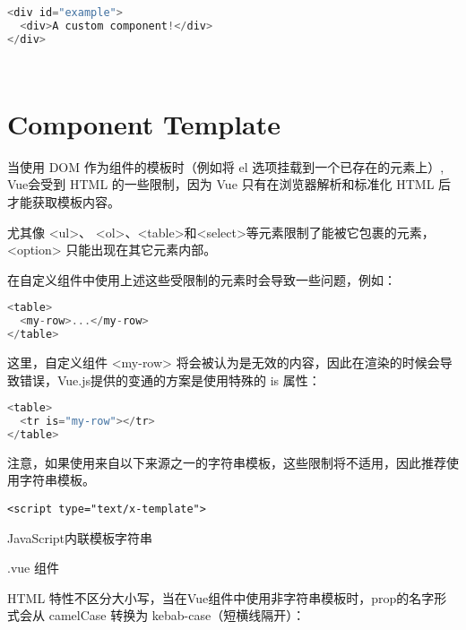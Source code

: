 \begin{lstlisting}[language=JavaScript]
<div id="example">
  <div>A custom component!</div>
</div>
\end{lstlisting}




\begin{lstlisting}[language=JavaScript]

\end{lstlisting}




\begin{lstlisting}[language=JavaScript]

\end{lstlisting}



\section{Component Template}


当使用 DOM 作为组件的模板时（例如将 el 选项挂载到一个已存在的元素上）, Vue会受到 HTML 的一些限制，因为 Vue 只有在浏览器解析和标准化 HTML 后才能获取模板内容。

尤其像 <ul>、 <ol>、<table>和<select>等元素限制了能被它包裹的元素， <option> 只能出现在其它元素内部。


在自定义组件中使用上述这些受限制的元素时会导致一些问题，例如：

\begin{lstlisting}[language=JavaScript]
<table>
  <my-row>...</my-row>
</table>
\end{lstlisting}

这里，自定义组件 <my-row> 将会被认为是无效的内容，因此在渲染的时候会导致错误，Vue.js提供的变通的方案是使用特殊的 is 属性：

\begin{lstlisting}[language=JavaScript]
<table>
  <tr is="my-row"></tr>
</table>
\end{lstlisting}

注意，如果使用来自以下来源之一的字符串模板，这些限制将不适用，因此推荐使用字符串模板。

\begin{compactitem}
\item \texttt{<script type="text/x-template">}
\item JavaScript内联模板字符串
\item .vue 组件
\end{compactitem}

HTML 特性不区分大小写，当在Vue组件中使用非字符串模板时，prop的名字形式会从 camelCase 转换为 kebab-case（短横线隔开）：

